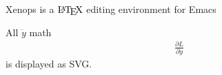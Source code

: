 \documentclass{article}
\begin{document}
Xenops is a $\text{\LaTeX}$ editing environment for Emacs

All $\dot{y}$ math
\begin{align*}
  \frac{\partial L}{\partial \dot{y}}
\end{align*}
is displayed as SVG.
\end{document}
